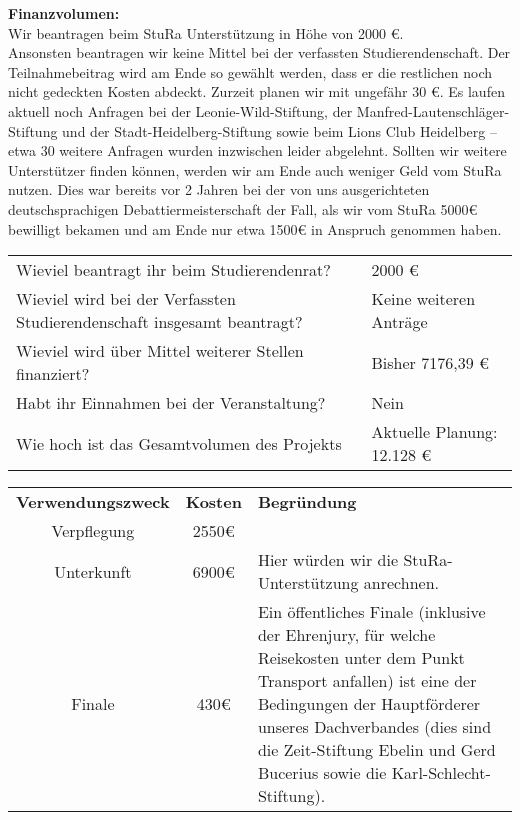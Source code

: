 {    \textbf{Finanzvolumen:}\\
    Wir beantragen beim StuRa Unterstützung in Höhe von 2000 €.\\[1em]
    Ansonsten beantragen wir keine Mittel bei der verfassten Studierendenschaft. Der Teilnahmebeitrag wird am Ende so gewählt werden, dass er die restlichen noch nicht gedeckten Kosten abdeckt. Zurzeit planen wir mit ungefähr 30 €. Es laufen aktuell noch Anfragen bei der Leonie-Wild-Stiftung, der Manfred-Lautenschläger-Stiftung und der Stadt-Heidelberg-Stiftung sowie beim Lions Club Heidelberg – etwa 30 weitere Anfragen wurden inzwischen leider abgelehnt. Sollten wir weitere Unterstützer finden können, werden wir am Ende auch weniger Geld vom StuRa nutzen. Dies war bereits vor 2 Jahren bei der von uns ausgerichteten deutschsprachigen Debattiermeisterschaft der Fall, als wir vom StuRa 5000€ bewilligt bekamen und am Ende nur etwa 1500€ in Anspruch genommen haben.\\[1em]
    \begin{tabular}{l l}
        Wieviel beantragt ihr beim Studierendenrat?                             & 2000 €                     \\
        Wieviel wird bei der Verfassten Studierendenschaft insgesamt beantragt? & Keine weiteren Anträge    \\
        Wieviel wird über Mittel weiterer Stellen finanziert?                   & Bisher 7176,39 €           \\
        Habt ihr Einnahmen bei der Veranstaltung?                               & Nein                      \\
        Wie hoch ist das Gesamtvolumen des Projekts                             & Aktuelle Planung: 12.128 € \\
    \end{tabular}
    \newline
    \vspace*{2em}
    \newline
    \begin{tabular}{c c p{10cm}}
        \textbf{Verwendungszweck} & \textbf{Kosten} & \textbf{Begründung} \\
        Verpflegung & 2550€ & \\
        Unterkunft & 6900€ & Hier würden wir die StuRa-Unterstützung anrechnen.\\
        Finale & 430€ & Ein öffentliches Finale (inklusive der Ehrenjury, für welche Reisekosten unter dem Punkt Transport anfallen) ist eine der Bedingungen der Hauptförderer unseres Dachverbandes (dies sind die Zeit-Stiftung Ebelin und Gerd Bucerius sowie die Karl-Schlecht-Stiftung). \\

\end{tabular}}
